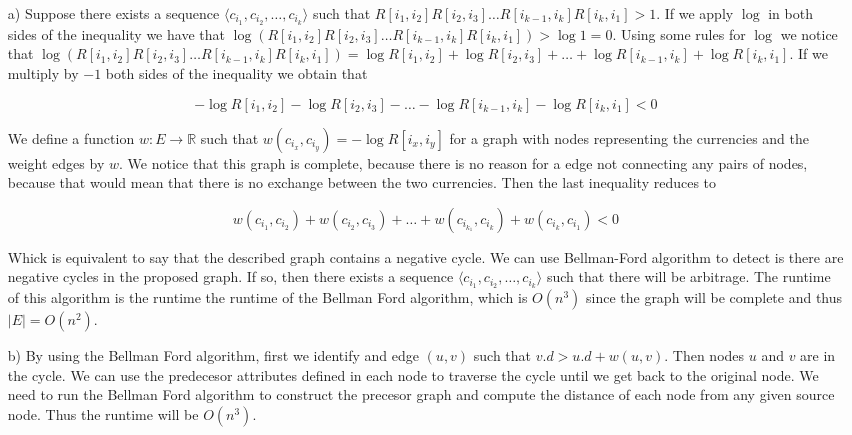 \documentclass[a4paper, 11pt]{article}
\begin{document}
\begin{itemize}
	\item [a)] Suppose there exists a sequence $\langle c_{i_1}, c_{i_2}, \dots, c_{i_k} \rangle$ such that $R[i_1, i_2]R[i_2, i_3] \dots R[i_{k−1}, i_k]R[i_k, i_1] > 1$. If we apply $\log$ in both sides of the inequality we have that $\log (R[i_1, i_2]R[i_2, i_3] \dots R[i_{k−1}, i_k]R[i_k, i_1]) > \log 1 = 0$. Using some rules for $\log$ we notice that $\log (R[i_1, i_2]R[i_2, i_3] \dots R[i_{k−1}, i_k]R[i_k, i_1]) = \log R[i_1, i_2] + \log R[i_2, i_3] + \dots + \log R[i_{k−1}, i_k] + \log R[i_k, i_1]$. If we multiply by $-1$ both sides of the inequality we obtain that 

	\begin{equation*}
		-\log R[i_1, i_2] - \log R[i_2, i_3] - \dots - \log R[i_{k−1}, i_k] - \log R[i_k, i_1] < 0
	\end{equation*}

	We define a function $w : E \rightarrow \mathbb{R}$ such that $w(c_{i_x}, c_{i_y}) = - \log R[i_x, i_y]$ for a graph with nodes representing the currencies and the weight edges by $w$. We notice that this graph is complete, because there is no reason for a edge not connecting any pairs of nodes, because that would mean that there is no exchange between the two currencies. Then the last inequality reduces to 

	\begin{equation*}
		w(c_{i_1}, c_{i_2}) + w(c_{i_2}, c_{i_3}) + \dots + w(c_{i_{k_1}}, c_{i_k}) + w(c_{i_k}, c_{i_1}) < 0
	\end{equation*}

	Whick is equivalent to say that the described graph contains a negative cycle. We can use Bellman-Ford algorithm to detect is there are negative cycles in the proposed graph. If so, then there exists a sequence $\langle c_{i_1}, c_{i_2}, \dots, c_{i_k} \rangle$ such that there will be arbitrage. The runtime of this algorithm is the runtime the runtime of the Bellman Ford algorithm, which is $O(n^3)$ since the graph will be complete and thus $|E| = O(n^2)$.

	\item [b)] By using the Bellman Ford algorithm, first we identify and edge $(u, v)$ such that $v.d > u.d + w(u, v)$. Then nodes $u$ and $v$ are in the cycle. We can use the predecesor attributes defined in each node to traverse the cycle until we get back to the original node. We need to run the Bellman Ford algorithm to construct the precesor graph and compute the distance of each node from any given source node. Thus the runtime will be $O(n^3)$.

\end{itemize}
\end{document}
